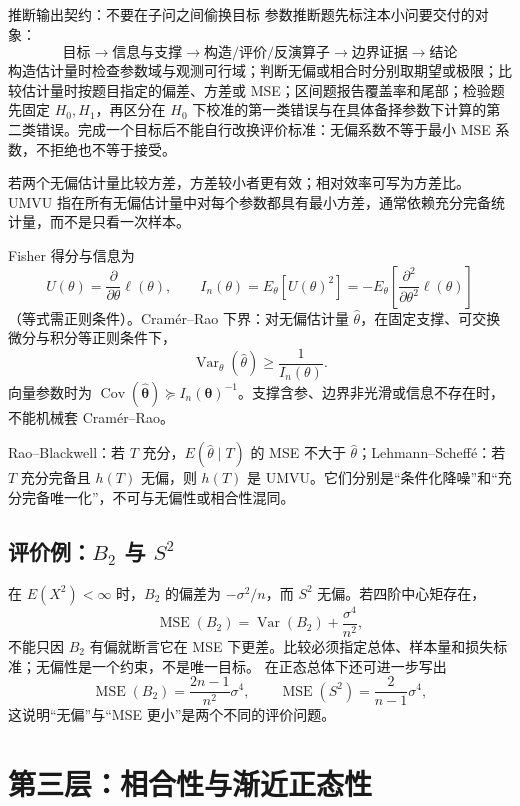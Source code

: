 \documentclass[11pt,a4paper]{ctexart}
\begin{document}
\begin{methodbox}{推断输出契约：不要在子问之间偷换目标}
参数推断题先标注本小问要交付的对象：
\[
\boxed{\text{目标}\to\text{信息与支撑}\to\text{构造/评价/反演算子}\to\text{边界证据}\to\text{结论}}
\]
构造估计量时检查参数域与观测可行域；判断无偏或相合时分别取期望或极限；比较估计量时按题目指定的偏差、方差或 MSE；区间题报告覆盖率和尾部；检验题先固定 $H_0,H_1$，再区分在 $H_0$ 下校准的第一类错误与在具体备择参数下计算的第二类错误。完成一个目标后不能自行改换评价标准：无偏系数不等于最小 MSE 系数，不拒绝也不等于接受。
\end{methodbox}

若两个无偏估计量比较方差，方差较小者更有效；相对效率可写为方差比。UMVU 指在所有无偏估计量中对每个参数都具有最小方差，通常依赖充分完备统计量，而不是只看一次样本。

Fisher 得分与信息为
\[
U(\theta)=\frac{\partial}{\partial\theta}\ell(\theta),\qquad
I_n(\theta)=E_\theta[U(\theta)^2]
=-E_\theta\left[\frac{\partial^2}{\partial\theta^2}\ell(\theta)\right]
\]
（等式需正则条件）。Cramér--Rao 下界：对无偏估计量 $\widehat\theta$，在固定支撑、可交换微分与积分等正则条件下，
\[
\boxed{\operatorname{Var}_\theta(\widehat\theta)\geq\frac1{I_n(\theta)}}.
\]
向量参数时为 $\operatorname{Cov}(\widehat{\boldsymbol\theta})\succeq I_n(\boldsymbol\theta)^{-1}$。支撑含参、边界非光滑或信息不存在时，不能机械套 Cramér--Rao。

Rao--Blackwell：若 $T$ 充分，$E(\widehat\theta\mid T)$ 的 MSE 不大于 $\widehat\theta$；Lehmann--Scheffé：若 $T$ 充分完备且 $h(T)$ 无偏，则 $h(T)$ 是 UMVU。它们分别是“条件化降噪”和“充分完备唯一化”，不可与无偏性或相合性混同。

\subsection{评价例：$B_2$ 与 $S^2$}

在 $E(X^2)<\infty$ 时，$B_2$ 的偏差为 $-\sigma^2/n$，而 $S^2$ 无偏。若四阶中心矩存在，
\[
\operatorname{MSE}(B_2)=\operatorname{Var}(B_2)+\frac{\sigma^4}{n^2},
\]
不能只因 $B_2$ 有偏就断言它在 MSE 下更差。比较必须指定总体、样本量和损失标准；无偏性是一个约束，不是唯一目标。
在正态总体下还可进一步写出
\[
\operatorname{MSE}(B_2)=\frac{2n-1}{n^2}\sigma^4,
\qquad
\operatorname{MSE}(S^2)=\frac{2}{n-1}\sigma^4,
\]
这说明“无偏”与“MSE 更小”是两个不同的评价问题。

\section{第三层：相合性与渐近正态性}
\end{document}
